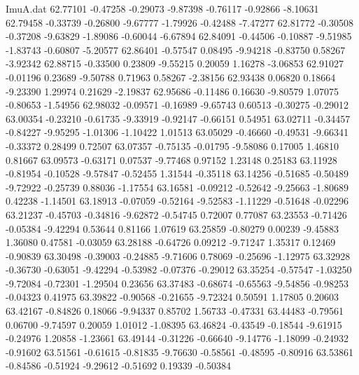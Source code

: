 \begin{filecontents}{ImuA.dat}
  62.77101   -0.47258   -0.29073   -9.87398   -0.76117   -0.92866   -8.10631
  62.79458   -0.33739   -0.26800   -9.67777   -1.79926   -0.42488   -7.47277
  62.81772   -0.30508   -0.37208   -9.63829   -1.89086   -0.60044   -6.67894
  62.84091   -0.44506   -0.10887   -9.51985   -1.83743   -0.60807   -5.20577
  62.86401   -0.57547    0.08495   -9.94218   -0.83750    0.58267   -3.92342
  62.88715   -0.33500    0.23809   -9.55215    0.20059    1.16278   -3.06853
  62.91027   -0.01196    0.23689   -9.50788    0.71963    0.58267   -2.38156
  62.93438    0.06820    0.18664   -9.23390    1.29974    0.21629   -2.19837
  62.95686   -0.11486    0.16630   -9.80579    1.07075   -0.80653   -1.54956
  62.98032   -0.09571   -0.16989   -9.65743    0.60513   -0.30275   -0.29012
  63.00354   -0.23210   -0.61735   -9.33919   -0.92147   -0.66151    0.54951
  63.02711   -0.34457   -0.84227   -9.95295   -1.01306   -1.10422    1.01513
  63.05029   -0.46660   -0.49531   -9.66341   -0.33372    0.28499    0.72507
  63.07357   -0.75135   -0.01795   -9.58086    0.17005    1.46810    0.81667
  63.09573   -0.63171    0.07537   -9.77468    0.97152    1.23148    0.25183
  63.11928   -0.81954   -0.10528   -9.57847   -0.52455    1.31544   -0.35118
  63.14256   -0.51685   -0.50489   -9.72922   -0.25739    0.88036   -1.17554
  63.16581   -0.09212   -0.52642   -9.25663   -1.80689    0.42238   -1.14501
  63.18913   -0.07059   -0.52164   -9.52583   -1.11229   -0.51648   -0.02296
  63.21237   -0.45703   -0.34816   -9.62872   -0.54745    0.72007    0.77087
  63.23553   -0.71426   -0.05384   -9.42294    0.53644    0.81166    1.07619
  63.25859   -0.80279    0.00239   -9.45883    1.36080    0.47581   -0.03059
  63.28188   -0.64726    0.09212   -9.71247    1.35317    0.12469   -0.90839
  63.30498   -0.39003   -0.24885   -9.71606    0.78069   -0.25696   -1.12975
  63.32928   -0.36730   -0.63051   -9.42294   -0.53982   -0.07376   -0.29012
  63.35254   -0.57547   -1.03250   -9.72084   -0.72301   -1.29504    0.23656
  63.37483   -0.68674   -0.65563   -9.54856   -0.98253   -0.04323    0.41975
  63.39822   -0.90568   -0.21655   -9.72324    0.50591    1.17805    0.20603
  63.42167   -0.84826    0.18066   -9.94337    0.85702    1.56733   -0.47331
  63.44483   -0.79561    0.06700   -9.74597    0.20059    1.01012   -1.08395
  63.46824   -0.43549   -0.18544   -9.61915   -0.24976    1.20858   -1.23661
  63.49144   -0.31226   -0.66640   -9.14776   -1.18099   -0.24932   -0.91602
  63.51561   -0.61615   -0.81835   -9.76630   -0.58561   -0.48595   -0.80916
  63.53861   -0.84586   -0.51924   -9.29612   -0.51692    0.19339   -0.50384

\end{filecontents}
